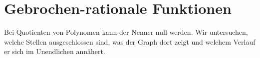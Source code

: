 \section{Gebrochen-rationale Funktionen}
\label{sec:real_functions_rational_functions}
Bei Quotienten von Polynomen kann der Nenner null werden. Wir untersuchen,
welche Stellen ausgeschlossen sind, was der Graph dort zeigt und welchem
Verlauf er sich im Unendlichen annähert.


\clearpage

